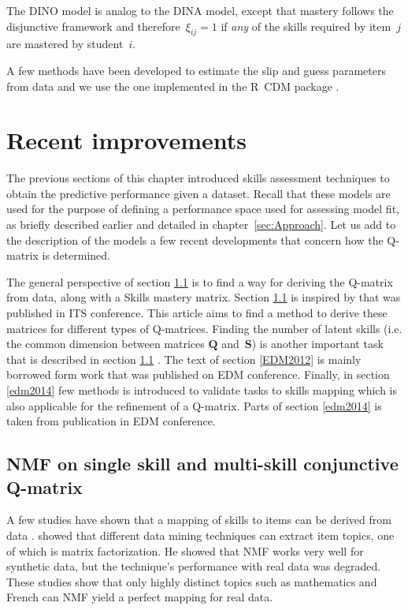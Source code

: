 The DINO model is analog to the DINA model, except that mastery follows the disjunctive framework and therefore~$\xi_{ij}=1$ if \textit{any} of the skills required by item~$j$ are mastered by student~$i$.

A few methods have been developed to estimate the slip and guess parameters from data and we use the one implemented in the R~CDM package \citep{Robitzsch2012}.

\section{Recent improvements}

The previous sections of this chapter introduced skills assessment techniques to obtain the predictive performance given a dataset. Recall that these models are used for the purpose of defining a performance space used for assessing model fit, as briefly described earlier and detailed in chapter~\ref{sec:Approach}.  Let us add to the description of the models a few recent developments that concern how the Q-matrix is determined.

The general perspective of section \ref{ITS2012} is to find a way for deriving the Q-matrix from data, along with a Skills mastery matrix. Section \ref{ITS2012} is inspired by \citet{desmarais2012mapping} that was published in ITS conference. This article aims to find a method to derive these matrices for different types of Q-matrices. Finding the number of latent skills (i.e. the common dimension between matrices $\mathbf{Q}$ and~$\mathbf{S}$) is another important task that is described in section \ref{ITS2012} . The text of section \ref{EDM2012} is mainly borrowed form \citet{Beheshti2012Numbers} work that was published on EDM conference. Finally, in section \ref{edm2014} few methods is introduced to validate tasks to skills mapping which is also applicable for the refinement of a Q-matrix. Parts of section \ref{edm2014} is taken from \citet{desmarais2014refinement} publication in EDM conference.


\subsection{NMF on single skill and multi-skill conjunctive Q-matrix}
\label{ITS2012}

A few studies have shown that a mapping of skills to items can be derived from data \citep{winters2006,desmarais2011conditions}. \citet{winters2006} showed that different data mining techniques can extract item topics, one of which is matrix factorization. He showed that NMF works very well for synthetic data, but the technique's performance with real data was degraded. These studies show that only highly distinct topics such as mathematics and French can NMF yield a perfect mapping for real data. 


